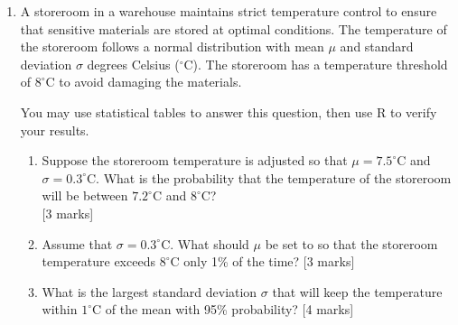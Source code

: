 \begin{enumerate}
\[
\sigma
\]

\begin{enumerate}
\item State the distribution of $X$, including all its parameters.
	\hfill [2 marks]

%
\item What is the minimum sample size needed so that the probability of finding at least one defect-free product exceeds 99\%?
	\hfill [3~marks]

%
\item Calculate the expected value and variance of the factory's net savings.
	\hfill [3 marks]

\item What is the probability that the factory will save at least \$27 on a given day?
	\hfill [2~marks]

\end{enumerate}

\vspace{0.5cm}

\item A storeroom in a warehouse maintains strict temperature control to ensure that sensitive materials are stored at optimal conditions. The temperature of the storeroom follows a normal distribution with mean $\mu$ and standard deviation $\sigma$ degrees Celsius ($^{\circ}$C). The storeroom has a temperature threshold of $8^\circ$C to avoid damaging the materials.

You may use statistical tables to answer this question, then use \textsf{R} to verify your results.

\begin{enumerate}
\item Suppose the storeroom temperature is adjusted so that $\mu = 7.5^\circ$C and $\sigma = 0.3^\circ$C. What is the probability that the temperature of the storeroom will be between $7.2^\circ$C and $8^\circ$C?
	\\\phantom{1} \hfill [3 marks]

%
\item Assume that $\sigma=0.3^\circ$C. What should $\mu$ be set to so that the storeroom temperature exceeds $8^\circ$C only 1\% of the time?
	\hfill [3 marks]

\item What is the largest standard deviation $\sigma$ that will keep the temperature within $1^\circ$C of the mean with 95\% probability?
	\hfill [4 marks]

\end{enumerate}
\vspace{0.5cm}


\end{enumerate}
